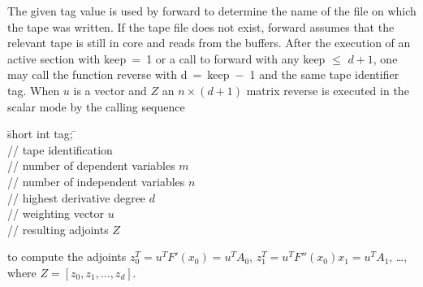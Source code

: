 \documentclass[11pt,twoside]{article}
\begin{document}
The given {\sf tag} value is used by {\sf forward} to determine the
name of the file on which the tape was written. If the tape file does
not exist, {\sf forward} assumes that the relevant 
tape is still in core and reads from the buffers.
After the execution of an active section with \mbox{{\sf keep} = 1} or a call to
{\sf forward} with any {\sf keep} $\leq$ $d+1$, one may call
the function {\sf reverse} with \mbox{{\sf d} = {\sf keep} $-$ 1} and the same tape
identifier {\sf tag}. When $u$ is a vector 
and $Z$ an $n\times (d+1)$ matrix 
{\sf reverse} is executed in the scalar mode by the calling
sequence
%
\begin{tabbing}
\hspace{0.5in}\={\sf short int tag;} \hspace{1.1in}\= \kill    %
\\
         \> // tape identification \\
                 \> // number of dependent variables $m$\\
                 \> // number of independent variables $n$\\
                \> // highest derivative degree $d$\\ 
          \> // weighting vector $u$\\
      \> // resulting adjoints $Z$  
\end{tabbing}
to compute
the adjoints $z_0^T=u^T F'(x_0)=u^T A_0$, $z_1^T=u^T F''(x_0)x_1=u^T A_1$, 
\ldots, where $Z=[z_0,z_1,\ldots,z_d]$.
%
\end{document}
